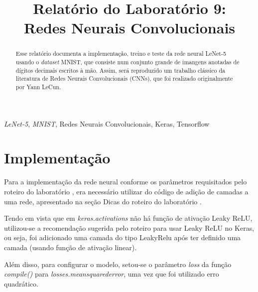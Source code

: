 \documentclass[conference]{IEEEtran}
\begin{document}
\title{Relatório do Laboratório 9: \\ Redes Neurais Convolucionais\\
}

\author{
}

\maketitle

\begin{abstract}
Esse relatório documenta a implementação, treino e teste da rede neural LeNet-5 usando o \textit{dataset} MNIST, que consiste num conjunto grande de imangens anotadas de dígitos decimais escritos à mão. Assim, será reproduzido um trabalho clássico da literatura de Redes Neurais Convolucionais (CNNs), que foi realizado originalmente por Yann LeCun.
\end{abstract}

\begin{IEEEkeywords}
\textit{LeNet-5}, \textit{MNIST}, Redes Neurais Convolucionais, Keras, Tensorflow
\end{IEEEkeywords}

\section{Implementação}
Para a implementação da rede neural conforme os parâmetros requisitados pelo roteiro do laboratório \cite{roteiro}, era necessário utilizar do código de adição de camadas a uma rede, apresentado na seção Dicas do roteiro do laboratório \cite{roteiro}. 

Tendo em vista que em \textit{keras.activations} não há função de ativação Leaky ReLU, utilizou-se a recomendação sugerida pelo roteiro \cite{roteiro} para usar Leaky ReLU no Keras, ou seja, foi adicionado uma camada do tipo LeakyRelu após ter definido uma camada (usando função de ativação linear).

Além disso, para configurar o modelo, setou-se o parâmetro \textit{loss} da função \textit{compile()} para \textit{losses.mean\underline{\space}squared\underline{\space}error}, uma vez que foi utilizado erro quadrático.
\end{document}
